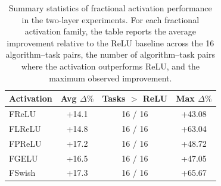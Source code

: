 \begin{table}[!htbp]
\centering
\caption{Summary statistics of fractional activation performance in the two-layer experiments. For each fractional activation family, the table reports the average improvement relative to the ReLU baseline across the 16 algorithm--task pairs, the number of algorithm--task pairs where the activation outperforms ReLU, and the maximum observed improvement.}
\label{tab:fractional-activation-summary}
\small
\setlength{\tabcolsep}{6pt}
\renewcommand{\arraystretch}{1.1}
\begin{tabular}{lccc}
\toprule
Activation & Avg $\Delta\%$ & Tasks $>$ ReLU & Max $\Delta\%$ \\
\midrule
FReLU & +14.1 & 16 / 16 & +43.08 \\
FLReLU & +14.8 & 16 / 16 & +63.04 \\
FPReLU & +17.2 & 16 / 16 & +48.72 \\
FGELU & +16.5 & 16 / 16 & +47.05 \\
FSwish & +17.3 & 16 / 16 & +65.67 \\
\bottomrule
\end{tabular}
\end{table}
